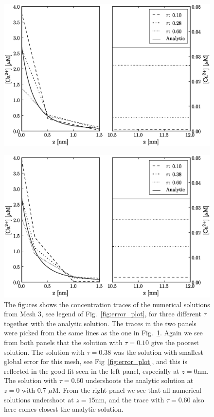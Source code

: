 \begin{figure}[t]
  \centering
    \includegraphics[width=\leftfigsize]{chapters/hake/eps/traces_mesh_2}
    \caption{\captiontwo}
    \label{fig:traces_mesh_2}
\end{figure}

\newcommand{\captionthree}{The figures shows the concentration traces of the numerical solutions from Mesh 3, see legend of Fig.~\ref{fig:error_plot}, for three different $\tau$ together with the analytic solution. The traces in the two panels were picked from the same lines as the one in Fig.~\ref{fig:traces_mesh_2}. Again we see from both panels that the solution with $\tau=0.10$ give the poorest solution. The solution with $\tau=0.38$ was the solution with smallest global error for this mesh, see Fig~\ref{fig:error_plot}, and this is reflected in the good fit seen in the left panel, especially at $z=0$nm. The solution with $\tau=0.60$ undershoots the analytic solution at $z=0$ with \~0.7 $\mu$M. From the right panel we see that all numerical solutions undershoot at $z=15$nm, and the trace with $\tau=0.60$ also here comes closest the analytic solution.}

\begin{figure}[t]
  \centering
    \includegraphics[width=\leftfigsize]{chapters/hake/eps/traces_mesh_3}
    \caption{\captionthree}
    \label{fig:traces_mesh_3}
\end{figure}

